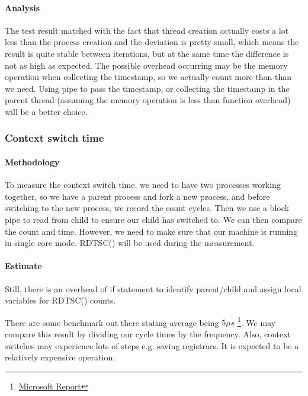 \paragraph{Analysis}

The test result matched with the fact that thread creation actually costs a lot less than the process creation and the deviation is pretty small, which means the result is quite stable between iterations, but at the same time the difference is not as high as expected. The possible overhead occurring may be the memory operation when collecting the timestamp, so we actually count more than than we need. Using pipe to pass the timestamp, or collecting the timestamp in the parent thread (assuming the memory operation is less than function overhead) will be a better choice.

\subsubsection{Context switch time}


\paragraph{Methodology}

To measure the context switch time, we need to have two processes working together, so we have a parent process and fork a new process, and before switching to the new process, we record the count cycles. Then we use a block pipe to read from child to ensure our child has switched to. We can then compare the count and time. However, we need to make sure that our machine is running in single core mode. RDTSC() will be used during the measurement. 

\paragraph{Estimate}

Still, there is an overhead of if statement to identify parent/child and assign local variables for RDTSC() counts. 

There are some benchmark out there stating average being $5 \mu s$ \footnote{\href{https://docs.microsoft.com/en-us/gaming/gdk/_content/gc/system/overviews/finding-threading-issues/high-context-switches}{Microsoft Report}}. We may compare this result by dividing our cycle times by the frequency. Also, context switches may experience lots of steps e.g. saving registrars. It is expected to be a relatively expensive operation.

